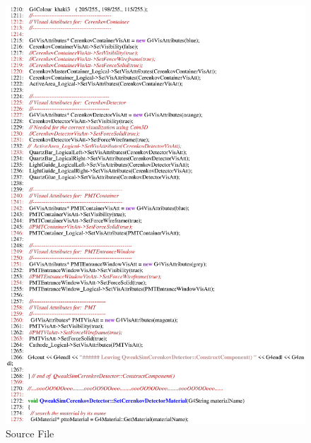 \begin{figure}[ht]
  \hspace{0cm}
  \includegraphics[scale=0.8]{./figures5/QweakSimCerenkovDetector.cc-p20.eps}
  \caption{\label{SourceV20} Source File}
           \label{fig:V-SC-24}
\end{figure}
\clearpage

